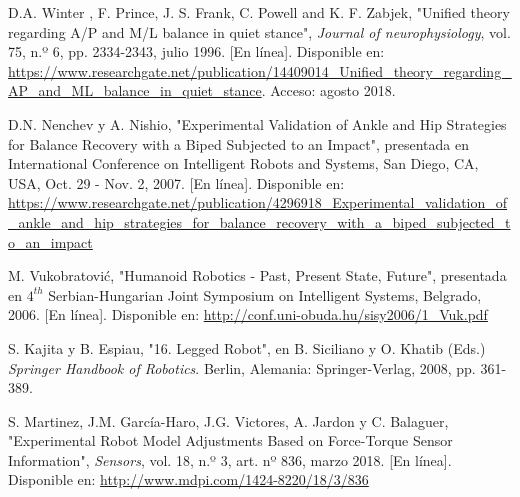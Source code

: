 \begin{thebibliography}{99}
 D.A. Winter , F. Prince, J. S. Frank, C. Powell and K. F. Zabjek, "Unified theory regarding A/P and M/L balance in quiet stance", \textit{Journal of neurophysiology}, vol. 75, n.º 6, pp. 2334-2343, julio 1996. [En línea]. Disponible en: \url{https://www.researchgate.net/publication/14409014_Unified_theory_regarding_AP_and_ML_balance_in_quiet_stance}. Acceso: agosto 2018.

 D.N. Nenchev y A. Nishio, "Experimental Validation of Ankle and Hip Strategies for Balance Recovery with a Biped Subjected to an Impact", presentada en International Conference on Intelligent Robots and Systems, San Diego, CA, USA, Oct. 29 - Nov. 2, 2007. [En línea]. Disponible en: \url{https://www.researchgate.net/publication/4296918_Experimental_validation_of_ankle_and_hip_strategies_for_balance_recovery_with_a_biped_subjected_to_an_impact}

 M. Vukobratović, "Humanoid Robotics - Past, Present State, Future", presentada en $4^{th}$ Serbian-Hungarian Joint Symposium on Intelligent Systems, Belgrado, 2006. [En línea]. Disponible en: \url{http://conf.uni-obuda.hu/sisy2006/1_Vuk.pdf}

 S. Kajita y B. Espiau, "16. Legged Robot", en B. Siciliano y O. Khatib (Eds.) \textit{Springer Handbook of Robotics}. Berlin, Alemania: Springer-Verlag, 2008, pp. 361-389.  

 S. Martinez, J.M. García-Haro, J.G. Victores, A. Jardon y C. Balaguer, "Experimental Robot Model Adjustments Based on Force-Torque Sensor Information", \textit{Sensors}, vol. 18, n.º 3, art. nº 836, marzo 2018. [En línea]. Disponible en: \url{http://www.mdpi.com/1424-8220/18/3/836} 


\end{thebibliography} 